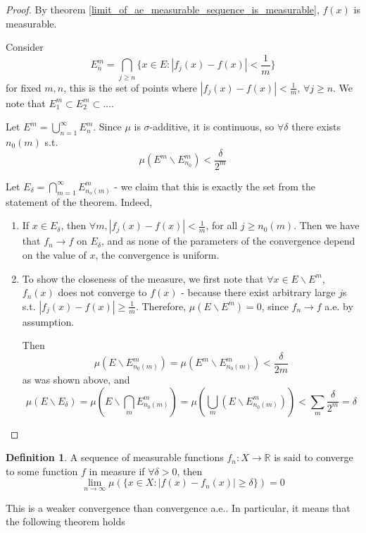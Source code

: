 \documentclass[11pt,a4paper]{report}
\theoremstyle{plain}
\theoremstyle{definition}
\newtheorem*{defn}{Definition}
\theoremstyle{remark}
\newcommand{\Union}{\bigcup}
\newcommand{\Intersection}{\bigcap}
\newcommand{\R}{\mathbb{R}}
\newcommand{\abs}[1]{\left| #1 \right|}
\begin{document}
\begin{proof}
    By theorem \ref{limit_of_ae_measurable_sequence_is_measurable}, $f(x)$ is measurable.

    Consider $$ E_n^m = \Intersection_{j \ge n} \{ x \in E : \abs{f_j(x) - f(x)} < \frac{1}{m} \} $$ for fixed $m, n$, this is the set of points where $\abs{f_j(x) - f(x)} < \frac{1}{m}$, $\forall j \ge n$. We note that $E_1^m \subset E_2^m \subset \dots$.

  Let $E^m = \Union_{n=1}^\infty E_n^m$. Since $\mu$ is $\sigma$-additive, it is continuous, so $\forall \delta$ there exists $n_0(m) $ s.t. $$\mu(E^m \backslash E_{n_0}^m) < \frac{\delta}{2^m}$$

  Let $E_\delta = \Intersection_{m=1}^\infty E_{n_o(m)}^m$ - we claim that this is exactly the set from the statement of the theorem. Indeed,

    \begin{enumerate}
        \item If $x \in E_\delta$, then $\forall m, \abs{f_j(x) - f(x)} < \frac{1}{m}$, for all $j \ge n_0(m)$. Then we have that $f_n \rightarrow f$ on $E_\delta$, and as none of the parameters of the convergence depend on the value of $x$, the convergence is uniform.
        \item To show the closeness of the measure, we first note that $\forall x \in E \backslash E^m$, $f_n(x)$ does not converge to $f(x)$ - because there exist arbitrary large $j$s s.t. $\abs{f_j(x) - f(x)} \ge \frac{1}{m}$. Therefore, $\mu(E \backslash E^m) = 0$, since $f_n \rightarrow f$ a.e. by assumption.

            Then $$ \mu(E \backslash E_{n_0(m)}^m) = \mu(E^m \backslash E_{n_0(m)}^m) < \frac{\delta}{2m} $$ as was shown above, and $$ \mu(E \backslash E_\delta) = \mu(E \backslash \Intersection_m E_{n_0(m)}^m) = \mu(\Union_m (E \backslash E_{n_0(m)}^m)) < \sum_m \frac{\delta}{2^m} = \delta $$
    \end{enumerate}
\end{proof}

\begin{defn}
    A sequence of measurable functions $f_n : X \rightarrow \R$ is said to converge to some function $f$ in measure if $\forall \delta > 0$, then $$ \lim_{n \rightarrow \infty} \mu(\{ x \in X : \abs{f(x) - f_n(x)} \ge \delta \}) = 0 $$
\end{defn}

This is a weaker convergence than convergence a.e.. In particular, it means that the following theorem holds
\end{document}
